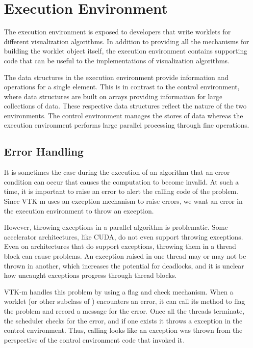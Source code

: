 
\chapter{Execution Environment}
\label{chap:ExecutionEnvironment}

The execution environment is exposed to developers that write worklets for
different visualization algorithms. In addition to providing all the
mechanisms for building the worklet object itself, the execution
environment contains supporting code that can be useful to the
implementations of visualization algorithms.

The data structures in the execution environment provide information and
operations for a single element. This is in contrast to the control
environment, where data structures are built on arrays providing
information for large collections of data. These respective data structures
reflect the nature of the two environments. The control environment manages
the stores of data whereas the execution environment performs large
parallel processing through fine operations.


\section{Error Handling}
\label{sec:ExecutionEnvironment:ErrorHandling}

It is sometimes the case during the execution of an algorithm that an error
condition can occur that causes the computation to become invalid. At such
a time, it is important to raise an error to alert the calling code of the
problem. Since VTK-m uses an exception mechanism to raise errors, we want
an error in the execution environment to throw an exception.

However, throwing exceptions in a parallel algorithm is problematic. Some
accelerator architectures, like CUDA, do not even support throwing
exceptions. Even on architectures that do support exceptions, throwing them
in a thread block can cause problems. An exception raised in one thread may
or may not be thrown in another, which increases the potential for
deadlocks, and it is unclear how uncaught exceptions progress through
thread blocks.

VTK-m handles this problem by using a flag and check mechanism. When a
worklet (or other subclass of ) encounters an error,
it can call its  method to flag the problem and record
a message for the error. Once all the threads terminate, the scheduler
checks for the error, and if one exists it throws a
 exception in the control environment. Thus,
calling  looks like an exception was thrown from the
perspective of the control environment code that invoked it.

